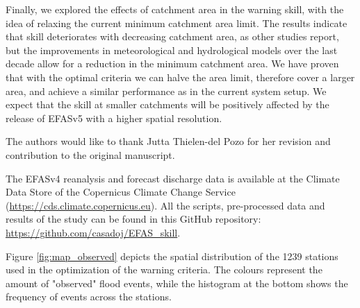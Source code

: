 \documentclass{ametsocV6.1}
\begin{document}
Finally, we explored the effects of catchment area in the warning skill, with the idea of relaxing the current minimum catchment area limit. The results indicate that skill deteriorates with decreasing catchment area, as other studies report, but the improvements in meteorological and hydrological models over the last decade allow for a reduction in the minimum catchment area. We have proven that with the optimal criteria we can halve the area limit, therefore cover a larger area, and achieve a similar performance as in the current system setup. We expect that the skill at smaller catchments will be positively affected by the release of EFASv5 with a higher spatial resolution.

\clearpage


\acknowledgments
The authors would like to thank Jutta Thielen-del Pozo for her revision and contribution to the original manuscript.


\datastatement
The EFASv4 reanalysis and forecast discharge data is available at the Climate Data Store of the Copernicus Climate Change Service (\url{https://cds.climate.copernicus.eu}). All the scripts, pre-processed data and results of the study can be found in this GitHub repository: \url{https://github.com/casadoj/EFAS_skill}.



\appendix[A] 
\label{appendix:obs_events}

Figure \ref{fig:map_observed} depicts the spatial distribution of the 1239 stations used in the optimization of the warning criteria. The colours represent the amount of "observed" flood events, while the histogram at the bottom shows the frequency of events across the stations.
\end{document}
